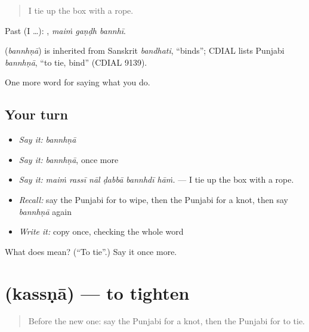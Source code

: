 \begin{quote}
I tie up the box with a rope.
\end{quote}

Past (I …):   , \emph{maiṁ gaṇḍh bannhī}.

\begin{cousinweb}
\textbf{} (\emph{bannhṇā}) is inherited from Sanskrit \emph{bandhati}, \textquotedblleft{}binds\textquotedblright{}; CDIAL lists Punjabi \emph{bannhṇā}, \textquotedblleft{}to tie, bind\textquotedblright{} (CDIAL 9139).
\end{cousinweb}

\begin{grammarlens}[title={What you've built}]
One more word for saying what you do.
\end{grammarlens}

\subsection*{Your turn}
\begin{itemize}
\raggedright
  \item \emph{Say it:} \emph{bannhṇā}
  \item \emph{Say it:} \emph{bannhṇā}, once more
  \item \emph{Say it:} \emph{maiṁ rassī nāl ḍabbā bannhdī hāṁ.} — I tie up the box with a rope.
  \item \emph{Recall:} say the Punjabi for to wipe, then the Punjabi for a knot, then say \emph{bannhṇā} again
  \item \emph{Write it:} copy \textbf{} once, checking the whole word
\end{itemize}

\begin{tcolorbox}[breakable,colback=teal!4,colframe=teal!35!black,title={Before you move on}]
What does  mean? (\textquotedblleft{}To tie\textquotedblright{}.) Say it once more.
\end{tcolorbox}
\section[\texorpdfstring{\pa{ਕੱਸਣਾ} (kassṇā)}{ਕੱਸਣਾ (kassṇā)}]{ (kassṇā) — to tighten}

\label{lesson:PA-C229-kassna}



\begin{quote}
Before the new one: say the Punjabi for a knot, then the Punjabi for to tie.
\end{quote}


